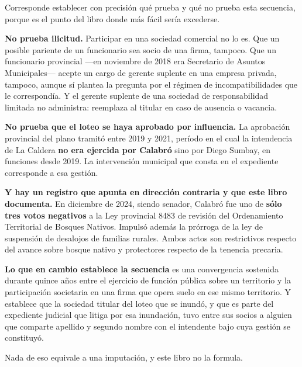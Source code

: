 \begin{cautela}
Corresponde establecer con precisión qué prueba y qué no prueba esta secuencia, porque es el punto del libro donde más fácil sería excederse.

\textbf{No prueba ilicitud.} Participar en una sociedad comercial no lo es. Que un posible pariente de un funcionario sea socio de una firma, tampoco. Que un funcionario provincial ---en noviembre de 2018 era Secretario de Asuntos Municipales--- acepte un cargo de gerente suplente en una empresa privada, tampoco, aunque sí plantea la pregunta por el régimen de incompatibilidades que le correspondía. Y el gerente suplente de una sociedad de responsabilidad limitada no administra: reemplaza al titular en caso de ausencia o vacancia.

\textbf{No prueba que el loteo se haya aprobado por influencia.} La aprobación provincial del plano tramitó entre 2019 y 2021, período en el cual la intendencia de La Caldera \textbf{no era ejercida por Calabró} sino por Diego Sumbay, en funciones desde 2019. La intervención municipal que consta en el expediente corresponde a esa gestión.

\textbf{Y hay un registro que apunta en dirección contraria y que este libro documenta.} En diciembre de 2024, siendo senador, Calabró fue uno de \textbf{sólo tres votos negativos} a la Ley provincial 8483 de revisión del Ordenamiento Territorial de Bosques Nativos. Impulsó además la prórroga de la ley de suspensión de desalojos de familias rurales. Ambos actos son restrictivos respecto del avance sobre bosque nativo y protectores respecto de la tenencia precaria.

\textbf{Lo que en cambio establece la secuencia} es una convergencia sostenida durante quince años entre el ejercicio de función pública sobre un territorio y la participación societaria en una firma que opera suelo en ese mismo territorio. Y establece que la sociedad titular del loteo que se inundó, y que es parte del expediente judicial que litiga por esa inundación, tuvo entre sus socios a alguien que comparte apellido y segundo nombre con el intendente bajo cuya gestión se constituyó.

Nada de eso equivale a una imputación, y este libro no la formula.
\end{cautela}

